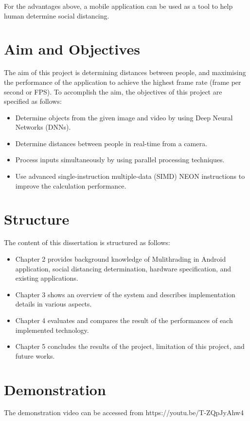         For the advantages above, a mobile application can be used as a tool to help human determine social distancing.

    \section{Aim and Objectives}
        The aim of this project is determining distances between people,
        and maximising the performance of the application to achieve the highest frame rate (frame per second or FPS).
        To accomplish the aim, the objectives of this project are specified as follows:
        \begin{itemize}
            \setlength\itemsep{1em}
            \item Determine objects from the given image and video by using Deep Neural Networks (DNNs).
            \item Determine distances between people in real-time from a camera.
            \item Process inputs simultaneously by using parallel processing techniques.
            \item Use advanced single-instruction multiple-data (SIMD) NEON instructions to improve the calculation performance.
        \end{itemize}

    \section{Structure}
        The content of this dissertation is structured as follows: \\
        \begin{itemize}
            \item  Chapter 2 provides background knowledge of Mulithrading in Android application,
            social distancing determination, hardware specification, and existing applications. \\
            \item  Chapter 3 shows an overview of the system and describes implementation details in various aspects.  \\
            \item  Chapter 4 evaluates and compares the result of the performances of each implemented technology. \\
            \item  Chapter 5 concludes the results of the project, limitation of this project, and future works.  \\
        \end{itemize}
    \section{Demonstration}
    The demonstration video can be accessed from https://youtu.be/T-ZQpJyAhw4